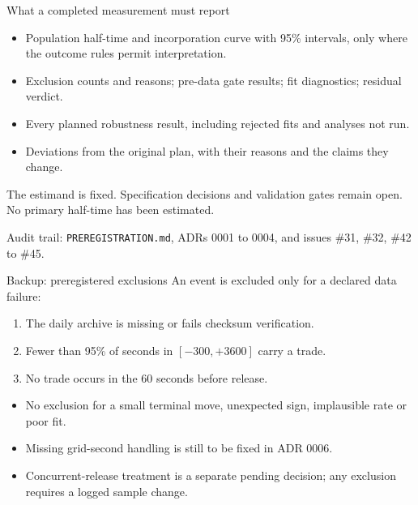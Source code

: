 \documentclass[aspectratio=169,11pt]{beamer}
\newcommand{\source}[1]{\par\vfill{\scriptsize\color{muted}#1}\par}
\newcommand{\heading}[1]{{\bfseries #1}\par\vspace{0.4em}}
\begin{document}
\begin{frame}{What a completed measurement must report}
\begin{itemize}
\item Population half-time and incorporation curve with 95\% intervals, only where the outcome rules permit interpretation.
\item Exclusion counts and reasons; pre-data gate results; fit diagnostics; residual verdict.
\item Every planned robustness result, including rejected fits and analyses not run.
\item Deviations from the original plan, with their reasons and the claims they change.
\end{itemize}
\vspace{0.5cm}\heading{Current stopping point}
The estimand is fixed. Specification decisions and validation gates remain open. No primary half-time has been estimated.
\source{Audit trail: \texttt{PREREGISTRATION.md}, ADRs 0001 to 0004, and issues \#31, \#32, \#42 to \#45.}
\end{frame}

\appendix
\begin{frame}{Backup: preregistered exclusions}
An event is excluded only for a declared data failure:
\begin{enumerate}
\item The daily archive is missing or fails checksum verification.
\item Fewer than 95\% of seconds in $[-300,+3600]$ carry a trade.
\item No trade occurs in the 60 seconds before release.
\end{enumerate}
\vspace{0.5cm}\begin{itemize}
\item No exclusion for a small terminal move, unexpected sign, implausible rate or poor fit.
\item Missing grid-second handling is still to be fixed in ADR 0006.
\item Concurrent-release treatment is a separate pending decision; any exclusion requires a logged sample change.
\end{itemize}
\end{frame}
\end{document}
